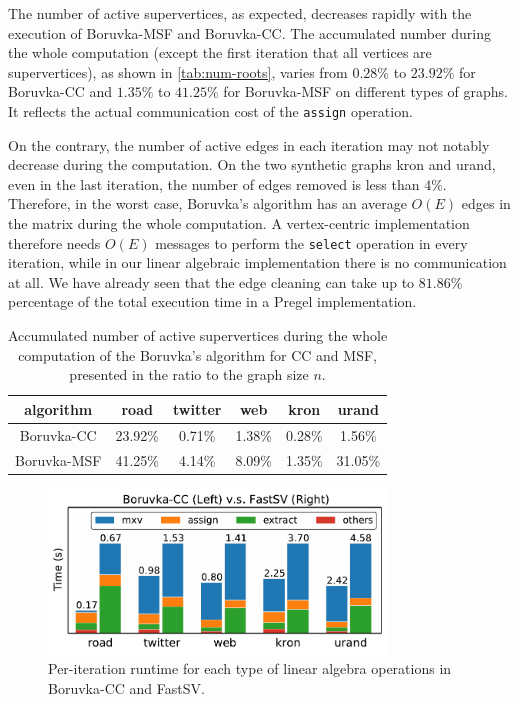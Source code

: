 \documentclass{sokendai_thesis} %
\newcommand{\boruvka}[0]{Boruvka}
\begin{document}
The number of active supervertices, as expected, decreases rapidly with the execution of \boruvka{}-MSF and \boruvka{}-CC.
The accumulated number during the whole computation (except the first iteration that all vertices are supervertices), as shown in \autoref{tab:num-roots}, varies from $0.28\%$ to $23.92\%$ for \boruvka{}-CC and $1.35\%$ to $41.25\%$ for \boruvka{}-MSF on different types of graphs.
It reflects the actual communication cost of the \texttt{assign} operation.

On the contrary, the number of active edges in each iteration may not notably decrease during the computation.
On the two synthetic graphs kron and urand, even in the last iteration, the number of edges removed is less than $4\%$.
Therefore, in the worst case, \boruvka{}'s algorithm has an average $O(E)$ edges in the matrix during the whole computation.
A vertex-centric implementation therefore needs $O(E)$ messages to perform the \texttt{select} operation in every iteration, while in our linear algebraic implementation there is no communication at all.
We have already seen that the edge cleaning can take up to $81.86\%$ percentage of the total execution time in a Pregel implementation.

\begin{table}
\centering
\caption{Accumulated number of active supervertices during the whole computation of the \boruvka{}'s algorithm for CC and MSF, presented in the ratio to the graph size $n$.}
\label{tab:num-roots}
\vspace{-8pt}
\begin{tabular}{c|c|c|c|c|c}
\hline
algorithm & road & twitter & web & kron & urand \\
\hline
\boruvka{}-CC & 23.92\% & 0.71\% & 1.38\% & 0.28\% & 1.56\% \\
\boruvka{}-MSF & 41.25\% & 4.14\% & 8.09\% & 1.35\% & 31.05\% \\
\hline
\end{tabular}
\vspace{-4pt}
\end{table}

\begin{figure}
\includegraphics[width=0.8\textwidth]{figures/CC-breakdown.pdf}
\caption{Per-iteration runtime for each type of linear algebra operations in \boruvka{}-CC and FastSV.}
\vspace{-10pt}
\label{fig:breakdown}
\end{figure}
\end{document}
